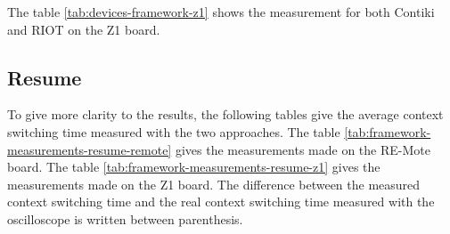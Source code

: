The table \ref{tab:devices-framework-z1} shows the measurement for both Contiki and RIOT on the Z1 board.



\subsection{Resume}
To give more clarity to the results, the following tables give the average context switching time measured with the two approaches.
The table \ref{tab:framework-measurements-resume-remote} gives the measurements made on the RE-Mote board.
The table \ref{tab:framework-measurements-resume-z1} gives the measurements made on the Z1 board.
The difference between the measured context switching time and the real context switching time measured with the oscilloscope is written between parenthesis.




